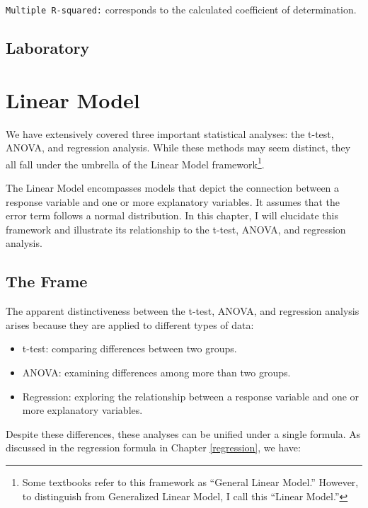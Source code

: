 \documentclass[
]{article}
\providecommand{\tightlist}{%
  \setlength{\itemsep}{0pt}\setlength{\parskip}{0pt}}
\begin{document}
\texttt{Multiple\ R-squared:} corresponds to the calculated coefficient of determination.

\hypertarget{laboratory-5}{%
\subsection{Laboratory}\label{laboratory-5}}

\hypertarget{linear-model}{%
\section{Linear Model}\label{linear-model}}

We have extensively covered three important statistical analyses: the t-test, ANOVA, and regression analysis. While these methods may seem distinct, they all fall under the umbrella of the Linear Model framework\footnote{Some textbooks refer to this framework as ``General Linear Model.'' However, to distinguish from Generalized Linear Model, I call this ``Linear Model.''}.

The Linear Model encompasses models that depict the connection between a response variable and one or more explanatory variables. It assumes that the error term follows a normal distribution. In this chapter, I will elucidate this framework and illustrate its relationship to the t-test, ANOVA, and regression analysis.

\hypertarget{the-frame}{%
\subsection{The Frame}\label{the-frame}}

The apparent distinctiveness between the t-test, ANOVA, and regression analysis arises because they are applied to different types of data:

\begin{itemize}
\tightlist
\item
  t-test: comparing differences between two groups.
\item
  ANOVA: examining differences among more than two groups.
\item
  Regression: exploring the relationship between a response variable and one or more explanatory variables.
\end{itemize}

Despite these differences, these analyses can be unified under a single formula. As discussed in the regression formula in Chapter \ref{regression}, we have:
\end{document}
